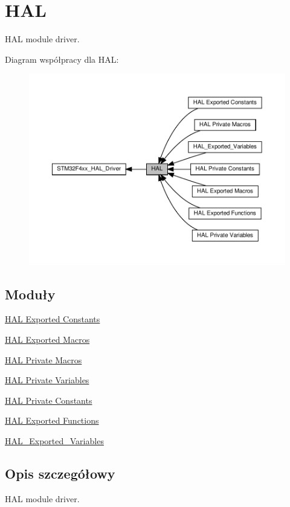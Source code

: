 \hypertarget{group___h_a_l}{}\section{H\+AL}
\label{group___h_a_l}


H\+AL module driver.  


Diagram współpracy dla H\+AL\+:\nopagebreak
\begin{figure}[H]
\begin{center}
\leavevmode
\includegraphics[width=350pt]{group___h_a_l}
\end{center}
\end{figure}
\subsection*{Moduły}
\begin{DoxyCompactItemize}
\item 
\hyperlink{group___h_a_l___exported___constants}{H\+A\+L Exported Constants}
\item 
\hyperlink{group___h_a_l___exported___macros}{H\+A\+L Exported Macros}
\item 
\hyperlink{group___h_a_l___private___macros}{H\+A\+L Private Macros}
\item 
\hyperlink{group___h_a_l___private___variables}{H\+A\+L Private Variables}
\item 
\hyperlink{group___h_a_l___private___constants}{H\+A\+L Private Constants}
\item 
\hyperlink{group___h_a_l___exported___functions}{H\+A\+L Exported Functions}
\item 
\hyperlink{group___h_a_l___exported___variables}{H\+A\+L\+\_\+\+Exported\+\_\+\+Variables}
\end{DoxyCompactItemize}


\subsection{Opis szczegółowy}
H\+AL module driver. 

